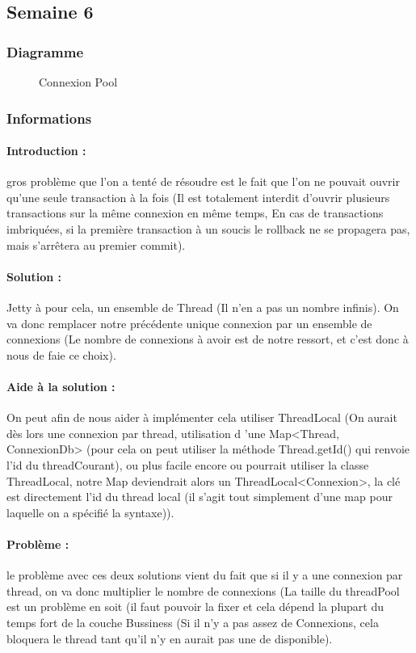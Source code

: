 \documentclass{article}[12pt]
\begin{document}
\subsection{Semaine 6}
\subsubsection{Diagramme}
\begin{figure}[H]
    \centering
    \caption{Connexion Pool}
\end{figure}
\subsubsection{Informations}
\paragraph{Introduction : } gros problème que l'on a tenté de résoudre est le fait que l'on ne pouvait ouvrir qu'une seule transaction à la fois (Il est totalement interdit d'ouvrir plusieurs transactions sur la même connexion en même temps, En cas de transactions imbriquées, si la première transaction à un soucis le rollback ne se propagera pas, mais s'arrêtera au premier commit). 
\paragraph{Solution : } Jetty à pour cela, un ensemble de Thread (Il n'en a pas un nombre infinis). On va donc remplacer notre précédente unique connexion par un ensemble de connexions (Le nombre de connexions à avoir est de notre ressort, et c'est donc à nous de faie ce choix).
\paragraph{Aide à la solution : } On peut afin de nous aider à implémenter cela utiliser ThreadLocal (On aurait dès lors une connexion par thread, utilisation d 'une Map<Thread, ConnexionDb> (pour cela on peut utiliser la méthode Thread.getId() qui renvoie l'id du threadCourant), ou plus facile encore ou pourrait utiliser la classe ThreadLocal, notre Map deviendrait alors un ThreadLocal<Connexion>, la clé est directement l'id du thread local (il s'agit tout simplement d'une map pour laquelle on a spécifié la syntaxe)). 
\paragraph{Problème : } le problème avec ces deux solutions vient du fait que si il y a une connexion par thread, on va donc multiplier le nombre de connexions (La taille du threadPool est un problème en soit (il faut pouvoir la fixer et cela dépend la plupart du temps fort de la couche Bussiness (Si il n'y a pas assez de Connexions, cela bloquera le thread tant qu'il n'y en aurait pas une de disponible). 
\end{document}
